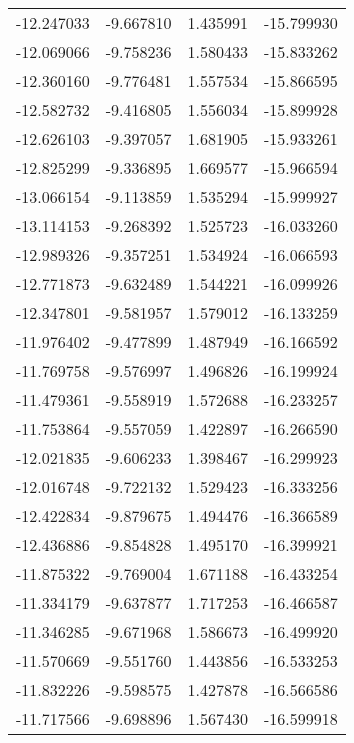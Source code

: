 \begin{tabular}{rrrr}
      -12.247033 &        -9.667810 &    1.435991 & -15.799930 \\
      -12.069066 &        -9.758236 &    1.580433 & -15.833262 \\
      -12.360160 &        -9.776481 &    1.557534 & -15.866595 \\
      -12.582732 &        -9.416805 &    1.556034 & -15.899928 \\
      -12.626103 &        -9.397057 &    1.681905 & -15.933261 \\
      -12.825299 &        -9.336895 &    1.669577 & -15.966594 \\
      -13.066154 &        -9.113859 &    1.535294 & -15.999927 \\
      -13.114153 &        -9.268392 &    1.525723 & -16.033260 \\
      -12.989326 &        -9.357251 &    1.534924 & -16.066593 \\
      -12.771873 &        -9.632489 &    1.544221 & -16.099926 \\
      -12.347801 &        -9.581957 &    1.579012 & -16.133259 \\
      -11.976402 &        -9.477899 &    1.487949 & -16.166592 \\
      -11.769758 &        -9.576997 &    1.496826 & -16.199924 \\
      -11.479361 &        -9.558919 &    1.572688 & -16.233257 \\
      -11.753864 &        -9.557059 &    1.422897 & -16.266590 \\
      -12.021835 &        -9.606233 &    1.398467 & -16.299923 \\
      -12.016748 &        -9.722132 &    1.529423 & -16.333256 \\
      -12.422834 &        -9.879675 &    1.494476 & -16.366589 \\
      -12.436886 &        -9.854828 &    1.495170 & -16.399921 \\
      -11.875322 &        -9.769004 &    1.671188 & -16.433254 \\
      -11.334179 &        -9.637877 &    1.717253 & -16.466587 \\
      -11.346285 &        -9.671968 &    1.586673 & -16.499920 \\
      -11.570669 &        -9.551760 &    1.443856 & -16.533253 \\
      -11.832226 &        -9.598575 &    1.427878 & -16.566586 \\
      -11.717566 &        -9.698896 &    1.567430 & -16.599918 \\

\end{tabular}
